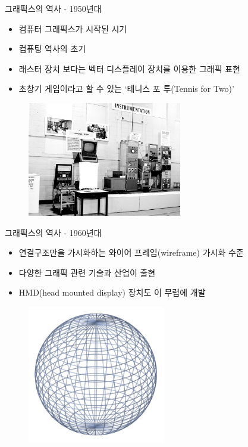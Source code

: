 \documentclass{beamer}
\begin{document}
\begin{frame}{그래픽스의 역사 - 1950년대}

\begin{itemize}
\item 컴퓨터 그래픽스가 시작된 시기
\item 컴퓨팅 역사의 초기
\item 래스터 장치 보다는 벡터 디스플레이 장치를 이용한 그래픽 표현
\item 초창기 게임이라고 할 수 있는 `테니스 포 투(Tennis for Two)'
\end{itemize}

\begin{figure}
    \includegraphics[height=5cm]{OGL_intro/tennis4two.jpg}
\end{figure}

\end{frame}

\begin{frame}{그래픽스의 역사 - 1960년대}

\begin{itemize}
\item 연결구조만을 가시화하는 와이어 프레임(wireframe) 가시화 수준
\item 다양한 그래픽 관련 기술과 산업이 출현
\item HMD(head mounted display) 장치도 이 무렵에 개발
\end{itemize}

\begin{figure}
    \includegraphics[height=6cm]{OGL_intro/wireframe.png}
\end{figure}

\end{frame}
\end{document}
